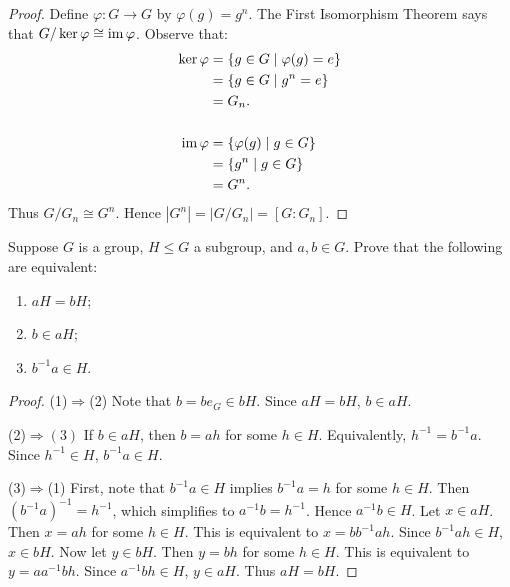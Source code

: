 \documentclass[11pt,twoside,openany]{memoir}
\begin{document}
{\begin{proof}
            Define $\varphi:G \rightarrow G$ by $\varphi(g) = g^n$. The First Isomorphism Theorem says that $G/\ker{\varphi} \cong \operatorname{im}{\varphi}$. Observe that:
                \begin{equation*}
                \begin{split}
                    \ker \varphi
                    & = \{g \in G \mid \varphi(g) = e\} \\
                    & = \{g \in G \mid g^n = e\} \\
                    & = G_n. \\
                    &\phantom = \\
                    \Image \varphi &= \{\varphi(g) \mid g \in G\} \\
                    & = \{g^n \mid g \in G\} \\
                    & = G^n.
                \end{split}
                \end{equation*}
            Thus $G/G_n \cong G^n$. Hence $|G^n| = |G/G_n| = [G:G_n]$.
        \end{proof}}

    \begin{exercise}
        Suppose $G$ is a group, $H \leq G$ a subgroup, and $a,b \in G$. Prove that the following are equivalent:
            \begin{enumerate}[label = (\arabic*),itemsep=1pt,topsep=3pt]
                \item $aH = bH$;
                \item $b \in aH$;
                \item $b^{-1}a \in H$.
            \end{enumerate}
    \end{exercise}
        {\color{blue} \begin{proof}
            (1)$\Rightarrow$(2) Note that $b = b e_G \in bH$. Since $aH = bH$, $b \in aH$.

            (2)$\Rightarrow(3)$ If $b \in aH$, then $b = ah$ for some $h \in H$. Equivalently, $h^{-1} = b^{-1}a$. Since $h^{-1} \in H$, $b^{-1}a \in H$.

            (3)$\Rightarrow$(1) First, note that $b^{-1}a \in H$ implies $b^{-1}a = h$ for some $h \in H$. Then $(b^{-1}a)^{-1} = h^{-1}$, which simplifies to $a^{-1}b = h^{-1}$. Hence $a^{-1}b \in H$. Let $x \in aH$. Then $x = ah$ for some $h \in H$. This is equivalent to $x = bb^{-1}ah$. Since $b^{-1}ah \in H$, $x \in bH$. Now let $y \in bH$. Then $y = bh$ for some $h \in H$. This is equivalent to $y = aa^{-1}bh$. Since $a^{-1}bh \in H$, $y \in aH$. Thus $aH = bH$.
        \end{proof}}
    
\end{document}
